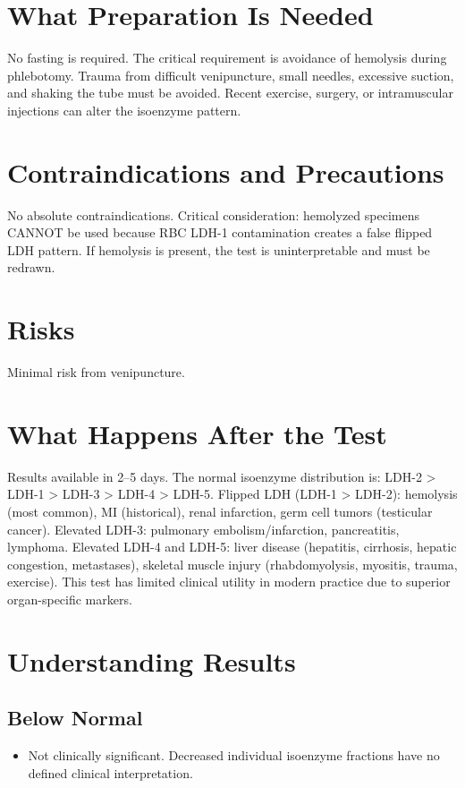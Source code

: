 \section*{What Preparation Is Needed}
No fasting is required. The critical requirement is avoidance of hemolysis during phlebotomy. Trauma from difficult venipuncture, small needles, excessive suction, and shaking the tube must be avoided. Recent exercise, surgery, or intramuscular injections can alter the isoenzyme pattern.

\section*{Contraindications and Precautions}
No absolute contraindications. Critical consideration: hemolyzed specimens CANNOT be used because RBC LDH-1 contamination creates a false flipped LDH pattern. If hemolysis is present, the test is uninterpretable and must be redrawn.

\section*{Risks}
Minimal risk from venipuncture.

\section*{What Happens After the Test}
Results available in 2--5 days. The normal isoenzyme distribution is: LDH-2 > LDH-1 > LDH-3 > LDH-4 > LDH-5. Flipped LDH (LDH-1 > LDH-2): hemolysis (most common), MI (historical), renal infarction, germ cell tumors (testicular cancer). Elevated LDH-3: pulmonary embolism/infarction, pancreatitis, lymphoma. Elevated LDH-4 and LDH-5: liver disease (hepatitis, cirrhosis, hepatic congestion, metastases), skeletal muscle injury (rhabdomyolysis, myositis, trauma, exercise). This test has limited clinical utility in modern practice due to superior organ-specific markers.

\section*{Understanding Results}

\subsection*{Below Normal}
\begin{itemize}
  \item Not clinically significant. Decreased individual isoenzyme fractions have no defined clinical interpretation.
\end{itemize}


